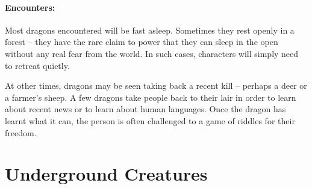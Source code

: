 \begin{multicols}{2}
\begin{boxtext}
\end{boxtext}

\paragraph{Encounters:} Most dragons encountered will be fast asleep.
Sometimes they rest openly in a forest -- they have the rare claim to power that they can sleep in the open without any real fear from the world.
In such cases, characters will simply need to retreat quietly.

At other times, dragons may be seen taking back a recent kill -- perhaps a deer or a farmer's sheep.
A few dragons take people back to their lair in order to learn about recent news or to learn about human languages.
Once the dragon has learnt what it can, the person is often challenged to a game of riddles for their freedom.  

\dragon

\end{multicols}

\section{Underground Creatures}

